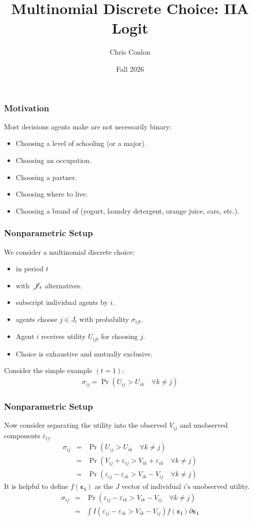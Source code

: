 \documentclass[aspectratio=169,11pt]{beamer}
\title{Multinomial Discrete Choice: IIA Logit}
\author{Chris Conlon}
\institute{Grad IO}
\date{Fall 2026}
\begin{document}
\frame{\titlepage}


\begin{frame}
\frametitle{Motivation}
Most decisions agents make are not necessarily binary:
\begin{itemize}
\item Choosing a level of schooling (or a major).
\item Choosing an occupation.
\item Choosing a partner.
\item Choosing where to live.
\item Choosing a brand of (yogurt, laundry detergent, orange juice, cars, etc.).
 \end{itemize}
\end{frame}

\begin{frame}
\frametitle{Nonparametric Setup}
We consider a \alert{multinomial discrete choice}:
\begin{itemize}
\item in period $t$
\item with $\mathscr{J}_t$ alternatives.
\item subscript individual agents by $i$.
\item agents choose $j \in J_t$ with probability $\sigma_{ijt}$.
\item Agent $i$ receives utility $U_{ijt}$ for choosing $j$.
\item Choice is exhaustive and mutually exclusive.
 \end{itemize}\pause
Consider the simple example $(t=1)$:
\begin{eqnarray*}
\sigma_{ij} = \Pr( U_{ij} > U_{ik} \quad \forall k \neq j)
\end{eqnarray*}
\end{frame}

\begin{frame}
\frametitle{Nonparametric Setup}
Now consider separating the utility into the \alert{observed} $V_{ij}$ and \alert{unobserved} components $\varepsilon_{ij}$.
\begin{eqnarray*}
\sigma_{ij} &=& \Pr( U_{ij} > U_{ik} \quad \forall k \neq j)\\
 &=& \Pr( V_{ij} + \varepsilon_{ij} > V_{ik} + \varepsilon_{ik} \quad \forall k \neq j)\\
 &=& \Pr( \varepsilon_{ij}-\varepsilon_{ik} > V_{ik} - V_{ij} \quad \forall k \neq j)
\end{eqnarray*}
\pause
It is helpful to define $f(\symbf{\varepsilon_{i}})$ as the $J$ vector of individual $i$'s unobserved utility.
\begin{eqnarray*}
\sigma_{ij} &=& \Pr( \varepsilon_{ij}-\varepsilon_{ik} > V_{ik} - V_{ij} \quad \forall k \neq j)\\
&=& \int I( \varepsilon_{ij}-\varepsilon_{ik} > V_{ik} - V_{ij} ) f( \symbf{\varepsilon_i}) \partial \symbf{\varepsilon_i} \\
\end{eqnarray*}
\end{frame}
\end{document}
